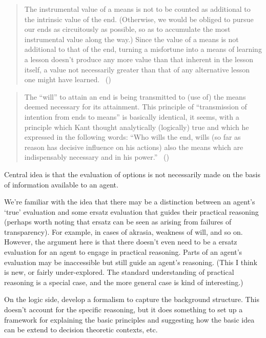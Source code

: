 \documentclass[10pt]{article}
\begin{document}
\begin{quote}
  The instrumental value of a means is not to be counted as additional to the intrinsic value of the end. (Otherwise, we would be obliged to pursue our ends as circuitously as possible, so as to accumulate the most instrumental value along the way.) Since the value of a means is not additional to that of the end, turning a misfortune into a means of learning a lesson doesn’t produce any more value than that inherent in the lesson itself, a value not necessarily greater than that of any alternative lesson one might have learned.\nolinebreak
  \mbox{ }\hfill(\cite[65]{Velleman:2009aa})
\end{quote}

\begin{quote}
  The ``will'' to attain an end is being transmitted to (use of) the means deemed necessary for its attainment.
  This principle of ``transmission of intention from ends to means'' is basically identical, it seems, with a principle which Kant thought analytically (logically) true and which he expressed in the following words: ``Who wills the end, wills (so far as reason has decisive influence on his actions) also the means which are indispensably necessary and in his power.''\nolinebreak
  \mbox{ }\hfill(\cite[40]{Von-Wright:1972aa})
\end{quote}





\newpage

Central idea is that the evaluation of options is not necessarily made on the basis of information available to an agent.

We're familiar with the idea that there may be a distinction between an agent's `true' evaluation and some ersatz evaluation that guides their practical reasoning (perhaps worth noting that ersatz can be seen as arising from failures of transparency).
For example, in cases of akrasia, weakness of will, and so on.
However, the argument here is that there doesn't even need to be a ersatz evaluation for an agent to engage in practical reasoning.
Parts of an agent's evaluation may be inaccessible but still guide an agent's reasoning.
{\color{red} (This I think is new, or fairly under-explored. The standard understanding of practical reasoning is a special case, and the more general case is kind of interesting.)}

On the logic side, develop a formalism to capture the background structure.
This doesn't account for the specific reasoning, but it does something to set up a framework for explaining the basic principles and suggesting how the basic idea can be extend to decision theoretic contexts, etc.
\end{document}
